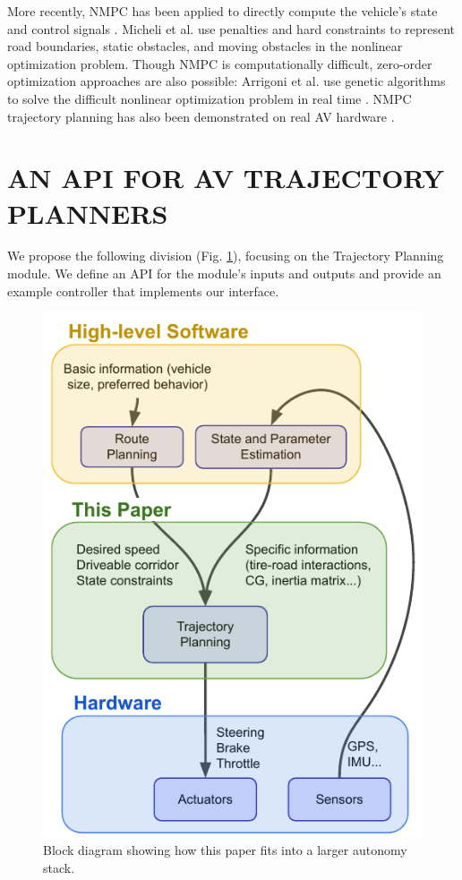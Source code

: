 \documentclass[letterpaper, 10 pt, conference]{ieeeconf}  %
\begin{document}
More recently, NMPC has been applied to directly compute the vehicle's state and control signals \cite{nmpc_micheli}. Micheli et al. use penalties and hard constraints to represent road boundaries, static obstacles, and moving obstacles in the nonlinear optimization problem.
Though NMPC is computationally difficult, zero-order optimization approaches are also possible: Arrigoni et al. use genetic algorithms to solve the difficult nonlinear optimization problem in real time \cite{arrigoni2021mpc}. NMPC trajectory planning has also been demonstrated on real AV hardware \cite{nmpc_platform}.

\section{AN API FOR AV TRAJECTORY PLANNERS}

We propose the following division (Fig. \ref{fig:block}), focusing on the Trajectory Planning module. We define an API for the module's inputs and outputs and provide an example controller that implements our interface.

\begin{figure}[h]
	\centering
	\includegraphics[width=0.7\linewidth]{figures/block_diagram.pdf}
	\caption{Block diagram showing how this paper fits into a larger autonomy stack.}
	\label{fig:block}
\end{figure}
\end{document}
